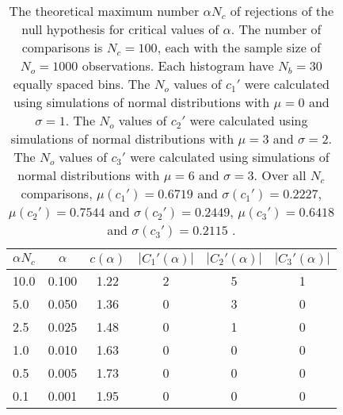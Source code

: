 \begin{table}[h!]
\begin{center}
\begin{tabular}{| l | c | c | c | c | c |}\hline
$\alpha N_c$ & $\alpha$ & $c(\alpha)$ & $|C_1'(\alpha)|$ & $|C_2'(\alpha)|$ & $|C_3'(\alpha)|$ \\\hline
10.0 & 0.100 & 1.22 & 2 & 5 & 1 \\\hline
5.0 & 0.050 & 1.36 & 0 & 3 & 0 \\\hline
2.5 & 0.025 & 1.48 & 0 & 1 & 0 \\\hline
1.0 & 0.010 & 1.63 & 0 & 0 & 0 \\\hline
0.5 & 0.005 & 1.73 & 0 & 0 & 0 \\\hline
0.1 & 0.001 & 1.95 & 0 & 0 & 0 \\\hline
\end{tabular}
\caption{The theoretical maximum number $\alpha N_c$ of rejections
of the null hypothesis for critical values of $\alpha$.
The number of comparisons is $N_c=100$,
each with the sample size of $N_o=1000$ observations.
Each histogram have $N_b=30$ equally spaced bins.
The $N_o$ values of $c_1'$ were calculated using simulations of
 normal distributions with $\mu=0$ and $\sigma=1$.
The $N_o$ values of $c_2'$ were calculated using simulations of
 normal distributions with $\mu=3$ and $\sigma=2$.
The $N_o$ values of $c_3'$ were calculated using simulations of
 normal distributions with $\mu=6$ and $\sigma=3$.
Over all $N_c$ comparisons,
 $\mu(c_1')=0.6719$ and $\sigma(c_1')=0.2227$,
 $\mu(c_2')=0.7544$ and $\sigma(c_2')=0.2449$,
 $\mu(c_3')=0.6418$ and $\sigma(c_3')=0.2115$ .
}
\end{center}
\end{table}